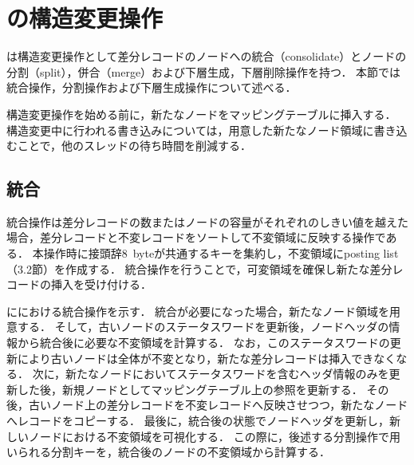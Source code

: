 \section{\Bcforest{}の構造変更操作}
\label{sec:smo}
\Bcforest{}は構造変更操作として差分レコードのノードへの統合（consolidate）とノードの分割（split），併合（merge）および下層生成，下層削除操作を持つ．
本節では統合操作，分割操作および下層生成操作について述べる．

構造変更操作を始める前に，新たなノードをマッピングテーブルに挿入する．
構造変更中に行われる書き込みについては，用意した新たなノード領域に書き込むことで，他のスレッドの待ち時間を削減する．

\subsection{統合}
統合操作は差分レコードの数またはノードの容量がそれぞれのしきい値を越えた場合，差分レコードと不変レコードをソートして不変領域に反映する操作である．
本操作時に接頭辞8~byteが共通するキーを集約し，不変領域にposting list（3.2節）を作成する．
統合操作を行うことで，可変領域を確保し新たな差分レコードの挿入を受け付ける．

\Fig{\ref{fig:bc_tree_consolidastion}}に\Bcforest{}における統合操作を示す．
統合が必要になった場合，新たなノード領域を用意する．
そして，古いノードのステータスワードを更新後，ノードヘッダの情報から統合後に必要な不変領域を計算する．
なお，このステータスワードの更新により古いノードは全体が不変となり，新たな差分レコードは挿入できなくなる．
次に，新たなノードにおいてステータスワードを含むヘッダ情報のみを更新した後，新規ノードとしてマッピングテーブル上の参照を更新する．
その後，古いノード上の差分レコードを不変レコードへ反映させつつ，新たなノードへレコードをコピーする．
最後に，統合後の状態でノードヘッダを更新し，新しいノードにおける不変領域を可視化する．
この際に，後述する分割操作で用いられる分割キーを，統合後のノードの不変領域から計算する．

